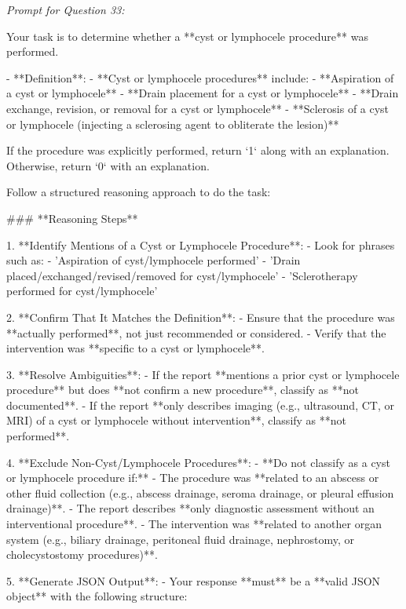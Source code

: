 \textit{\normalsize Prompt for Question  33:}
\begin{mdframed}[]
\normalsize

Your task is to determine whether a **cyst or lymphocele procedure** was performed.  

- **Definition**:  
  - **Cyst or lymphocele procedures** include:  
    - **Aspiration of a cyst or lymphocele**  
    - **Drain placement for a cyst or lymphocele**  
    - **Drain exchange, revision, or removal for a cyst or lymphocele**  
    - **Sclerosis of a cyst or lymphocele (injecting a sclerosing agent to obliterate the lesion)**  

If the procedure was explicitly performed, return `1` along with an explanation. Otherwise, return `0` with an explanation.

Follow a structured reasoning approach to do the task:

### **Reasoning Steps**  

1. **Identify Mentions of a Cyst or Lymphocele Procedure**:  
   - Look for phrases such as:  
     - 'Aspiration of cyst/lymphocele performed'  
     - 'Drain placed/exchanged/revised/removed for cyst/lymphocele'  
     - 'Sclerotherapy performed for cyst/lymphocele'  

2. **Confirm That It Matches the Definition**:  
   - Ensure that the procedure was **actually performed**, not just recommended or considered.  
   - Verify that the intervention was **specific to a cyst or lymphocele**.  

3. **Resolve Ambiguities**:  
   - If the report **mentions a prior cyst or lymphocele procedure** but does **not confirm a new procedure**, classify as **not documented**.  
   - If the report **only describes imaging (e.g., ultrasound, CT, or MRI) of a cyst or lymphocele without intervention**, classify as **not performed**.  

4. **Exclude Non-Cyst/Lymphocele Procedures**:  
   - **Do not classify as a cyst or lymphocele procedure if:**  
     - The procedure was **related to an abscess or other fluid collection (e.g., abscess drainage, seroma drainage, or pleural effusion drainage)**.  
     - The report describes **only diagnostic assessment without an interventional procedure**.  
     - The intervention was **related to another organ system (e.g., biliary drainage, peritoneal fluid drainage, nephrostomy, or cholecystostomy procedures)**.  

5. **Generate JSON Output**:  
   - Your response **must** be a **valid JSON object** with the following structure:  

\end{mdframed}

